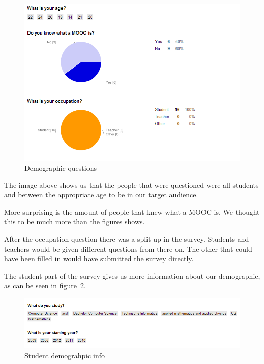 \begin{figure}[H]
    \centering
    \includegraphics[width=\textwidth]{images/demographic_chart}
    \caption{Demographic questions}
    \label{demographic_chart}
\end{figure}

The image above shows us that the people that were questioned were all students and between the appropriate age to be in our target audience.

More surprising is the amount of people that knew what a MOOC is.
We thought this to be much more than the figures shows.

After the occupation question there was a split up in the survey.
Students and teachers would be given different questions from there on.
The other that could have been filled in would have submitted the survey directly.

The student part of the survey gives us more information about our demographic, as can be seen in figure~\ref{student_demographic_info}.\\
\begin{figure}[H]
    \centering
    \includegraphics[width=\textwidth]{images/student_demographic_info}
    \caption{Student demograhpic info }
    \label{student_demographic_info}
\end{figure}

